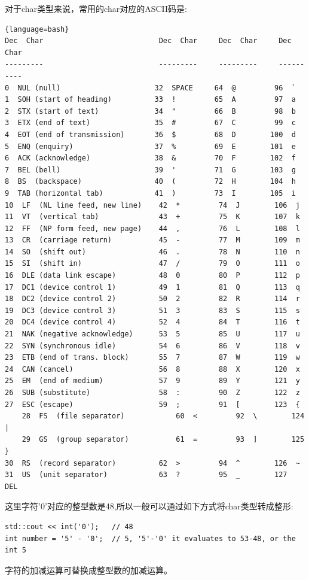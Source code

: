 \documentclass[12pt]{book}
\begin{document}
对于char类型来说，常用的char对应的ASCII码是:
\begin{lstlisting}{language=bash}
Dec  Char                           Dec  Char     Dec  Char     Dec  Char
---------                           ---------     ---------     ----------
0  NUL (null)                      32  SPACE     64  @         96  `
1  SOH (start of heading)          33  !         65  A         97  a
2  STX (start of text)             34  "         66  B         98  b
3  ETX (end of text)               35  #         67  C         99  c
4  EOT (end of transmission)       36  $         68  D        100  d
5  ENQ (enquiry)                   37  %         69  E        101  e
6  ACK (acknowledge)               38  &         70  F        102  f
7  BEL (bell)                      39  '         71  G        103  g
8  BS  (backspace)                 40  (         72  H        104  h
9  TAB (horizontal tab)            41  )         73  I        105  i
10  LF  (NL line feed, new line)    42  *         74  J        106  j
11  VT  (vertical tab)              43  +         75  K        107  k
12  FF  (NP form feed, new page)    44  ,         76  L        108  l
13  CR  (carriage return)           45  -         77  M        109  m
14  SO  (shift out)                 46  .         78  N        110  n
15  SI  (shift in)                  47  /         79  O        111  o
16  DLE (data link escape)          48  0         80  P        112  p
17  DC1 (device control 1)          49  1         81  Q        113  q
18  DC2 (device control 2)          50  2         82  R        114  r
19  DC3 (device control 3)          51  3         83  S        115  s
20  DC4 (device control 4)          52  4         84  T        116  t
21  NAK (negative acknowledge)      53  5         85  U        117  u
22  SYN (synchronous idle)          54  6         86  V        118  v
23  ETB (end of trans. block)       55  7         87  W        119  w
24  CAN (cancel)                    56  8         88  X        120  x
25  EM  (end of medium)             57  9         89  Y        121  y
26  SUB (substitute)                58  :         90  Z        122  z
27  ESC (escape)                    59  ;         91  [        123  {
	28  FS  (file separator)            60  <         92  \        124  |
	29  GS  (group separator)           61  =         93  ]        125  }
30  RS  (record separator)          62  >         94  ^        126  ~
31  US  (unit separator)            63  ?         95  _        127  DEL
\end{lstlisting}
这里字符'0'对应的整型数是48,所以一般可以通过如下方式将char类型转成整形:
\begin{lstlisting}
std::cout << int('0');   // 48
int number = '5' - '0';  // 5, '5'-'0' it evaluates to 53-48, or the int 5
\end{lstlisting}
字符的加减运算可替换成整型数的加减运算。
\end{document}
